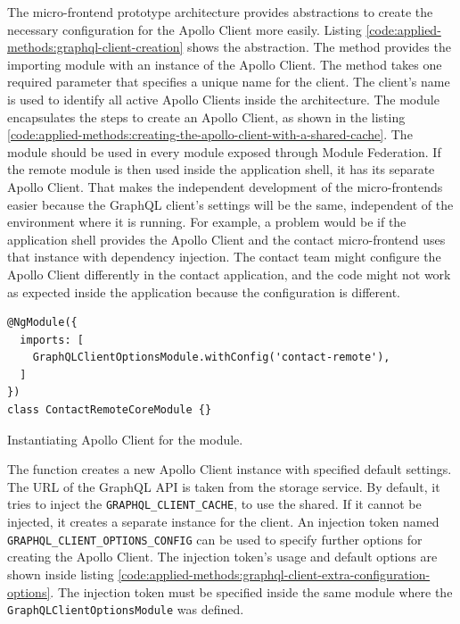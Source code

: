 \noindent The micro-frontend prototype architecture provides abstractions to create the necessary configuration for the Apollo Client more easily. Listing \ref{code:applied-methods:graphql-client-creation} shows the abstraction. The method provides the importing module with an instance of the Apollo Client. The method takes one required parameter that specifies a unique name for the client. The client's name is used to identify all active Apollo Clients inside the architecture. The module encapsulates the steps to create an Apollo Client, as shown in the listing \ref{code:applied-methods:creating-the-apollo-client-with-a-shared-cache}. The module should be used in every module exposed through Module Federation. If the remote module is then used inside the application shell, it has its separate Apollo Client. That makes the independent development of the micro-frontends easier because the GraphQL client's settings will be the same, independent of the environment where it is running. For example, a problem would be if the application shell provides the Apollo Client and the contact micro-frontend uses that instance with dependency injection. The contact team might configure the Apollo Client differently in the contact application, and the code might not work as expected inside the application because the configuration is different.

\ifshowListings
  \begin{listing}[H]
    \begin{verbatim}
@NgModule({
  imports: [
    GraphQLClientOptionsModule.withConfig('contact-remote'),
  ]
})
class ContactRemoteCoreModule {}
    \end{verbatim}
  \caption{Instantiating Apollo Client for the module.}\label{code:applied-methods:graphql-client-creation}
  \end{listing}
\fi

\noindent The function creates a new Apollo Client instance with specified default settings. The URL of the GraphQL API is taken from the storage service. By default, it tries to inject the \texttt{GRAPHQL\_CLIENT\_CACHE}, to use the shared. If it cannot be injected, it creates a separate instance for the client. An injection token named \texttt{GRAPHQL\_CLIENT\_OPTIONS\_CONFIG} can be used to specify further options for creating the Apollo Client. The injection token's usage and default options are shown inside listing \ref{code:applied-methods:graphql-client-extra-configuration-options}. The injection token must be specified inside the same module where the \texttt{GraphQLClientOptionsModule} was defined.

